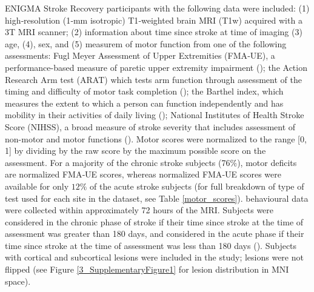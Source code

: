 \documentclass[phd,tocprelim]{cornell}
\begin{document}
ENIGMA Stroke Recovery participants with the following data were included: (1) high‐resolution (1‐mm isotropic) T1‐weighted brain MRI (T1w) acquired with a 3T MRI scanner; (2) information about time since stroke at time of imaging (3) age, (4), sex, and (5) measurem of motor function from one of the following assessments: Fugl Meyer Assessment of Upper Extremities (FMA‐UE), a performance-based measure of paretic upper extremity impairment (\cite{Gladstone2002-fw}); the Action Research Arm test (ARAT) which tests arm function through assessment of the timing and difficulty of motor task completion (\cite{Yozbatiran2008-xv}); the Barthel index, which measures the extent to which a person can function independently and has mobility in their activities of daily living (\cite{Sulter1999-rr}); National Institutes of Health Stroke Score (NIHSS), a broad measure of stroke severity that includes assessment of non-motor and motor functions (\cite{Lyden2017-za}). Motor scores were normalized to the range [0, 1] by dividing by the raw score by the maximum possible score on the assessment. For a majority of the chronic stroke subjects (76$\%$), motor deficits are normalized FMA‐UE scores, whereas  normalized FMA‐UE scores were available for only $12\%$ of the acute stroke subjects (for full breakdown of type of test used for each site in the dataset, see Table \ref{motor_scores}). behavioural data were collected within approximately 72 hours of the MRI. Subjects were considered in the chronic phase of stroke if their time since stroke at the time of assessment was greater than 180 days, and considered in the acute phase if their time since stroke at the time of assessment was less than 180 days (\cite{Bernhardt2017-av}). Subjects with cortical and subcortical lesions were included in the study; lesions were not flipped (see Figure \ref{3_SupplementaryFigure1} for lesion distribution in MNI space). 

\newpage
\end{document}
